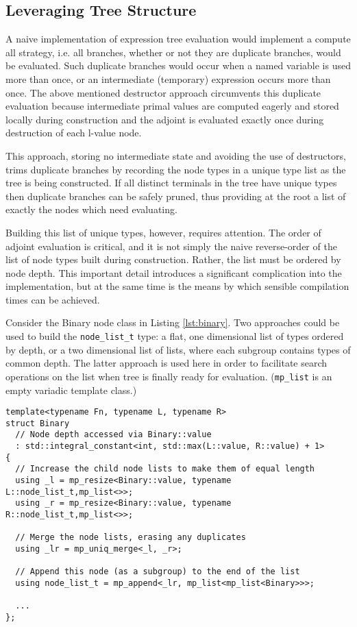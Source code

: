 \documentclass[a4paper,10pt]{article}
\begin{document}
\subsection{Leveraging Tree Structure}
A naive implementation of expression tree evaluation would implement a compute all strategy, i.e. all branches,
whether or not they are duplicate branches, would be evaluated. Such duplicate branches would occur when a
named variable is used more than once, or an intermediate (temporary) expression occurs more than once. The above
mentioned destructor approach circumvents this duplicate evaluation because intermediate primal values are computed
eagerly and stored locally during construction and the adjoint is evaluated exactly once during destruction of each
l-value node.

This approach, storing no intermediate state and avoiding the use of destructors, trims duplicate branches by
recording the node types in a unique type list as the tree is being constructed. If all distinct terminals in the tree
have unique types then duplicate branches can be safely pruned, thus providing at the root a list of exactly the nodes
which need evaluating.

Building this list of unique types, however, requires attention. The order of adjoint evaluation is critical, and it is
not simply the naive reverse-order of the list of node types built during construction. Rather, the list must be ordered
by node depth. This important detail introduces a significant complication into the implementation, but at the same
time is the means by which sensible compilation times can be achieved.

Consider the Binary node class in Listing \ref{lst:binary}. Two approaches could be used to build the \texttt{node\_list\_t} type: a flat,
one dimensional list of types ordered by depth, or a two dimensional list of lists, where each subgroup contains types
of common depth. The latter approach is used here in order to facilitate search operations on the list when tree is
finally ready for evaluation. (\texttt{mp\_list} is an empty variadic template class.)


\begin{lstlisting}[caption={Template metafunctions are used extensively to build the node list.}, label=lst:binary]
template<typename Fn, typename L, typename R>
struct Binary
  // Node depth accessed via Binary::value
  : std::integral_constant<int, std::max(L::value, R::value) + 1>
{
  // Increase the child node lists to make them of equal length
  using _l = mp_resize<Binary::value, typename L::node_list_t,mp_list<>>;
  using _r = mp_resize<Binary::value, typename R::node_list_t,mp_list<>>;

  // Merge the node lists, erasing any duplicates
  using _lr = mp_uniq_merge<_l, _r>;

  // Append this node (as a subgroup) to the end of the list
  using node_list_t = mp_append<_lr, mp_list<mp_list<Binary>>>;

  ...
};
\end{lstlisting}
\end{document}
